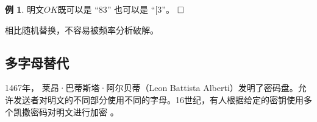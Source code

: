 \documentclass{article}
\theoremstyle{definition}
\newtheorem{example}{\indent 例}
\begin{document}
\begin{example}

明文$OK$既可以是 “$83$” 也可以是 “$[3$”。 $\hfill\square$ 

\end{example}

相比随机替换，不容易被频率分析破解。


\clearpage

\subsection{多字母替代}
1467年， 莱昂·巴蒂斯塔·阿尔贝蒂（Leon Battista Alberti）发明了密码盘。允许发送者对明文的不同部分使用不同的字母。16世纪，有人根据给定的密钥使用多个凯撒密码对明文进行加密
。

~\\
\end{document}
